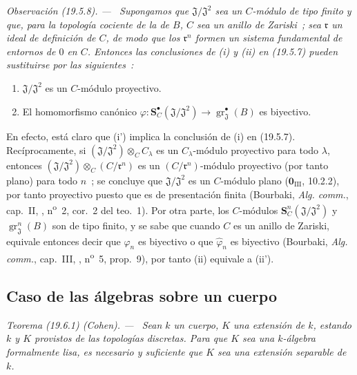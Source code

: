 \documentclass[10pt,oneside]{book}
\makeatletter
\newcommand{\gr}{\operatorname{gr}}
\newcommand{\setmanualcurrentlabel}[1]{\def\@currentlabel{#1}}
\newenvironment{theorem}[1][]{%
  \setmanualcurrentlabel{#1}\par\medskip\noindent\itshape Teorema (#1). ---\ }{\par}
\newenvironment{remark}[1][]{%
  \setmanualcurrentlabel{#1}\par\medskip\noindent\itshape Observación (#1). ---\ }{\par}
\makeatother
\begin{document}
\begin{remark}[19.5.8]
\label{0.19.5.8-es}
Supongamos que $\mathfrak J/\mathfrak J^2$ sea un $C$-módulo \emph{de tipo finito} y
que, para la topología cociente de la de $B$, $C$ sea un \emph{anillo de Zariski}~;
sea $\mathfrak r$ un ideal de definición de $C$, de modo que los
$\mathfrak r^n$ formen un sistema fundamental de entornos de $0$ en $C$.
Entonces las conclusiones de (i) y (ii) en (19.5.7) pueden sustituirse por
las siguientes~:
\begin{enumerate}
  \item[\rm(i')] $\mathfrak J/\mathfrak J^2$ es un $C$-módulo proyectivo.
  \item[\rm(ii')] El homomorfismo canónico
  $\varphi:\mathbf S_C^\bullet(\mathfrak J/\mathfrak J^2)
  \to\gr_{\mathfrak J}^\bullet(B)$ es biyectivo.
\end{enumerate}
En efecto, está claro que (i') implica la conclusión de (i) en (19.5.7).
Recíprocamente, si $(\mathfrak J/\mathfrak J^2)\otimes_C C_\lambda$ es un
$C_\lambda$-módulo proyectivo para todo $\lambda$, entonces
$(\mathfrak J/\mathfrak J^2)\otimes_C(C/\mathfrak r^n)$ es un
$(C/\mathfrak r^n)$-módulo proyectivo (por tanto plano) para todo $n$~; se concluye
que $\mathfrak J/\mathfrak J^2$ es un $C$-módulo plano
($\mathbf 0_{\mathrm{III}}$, 10.2.2), por tanto proyectivo puesto que es de
presentación finita (Bourbaki, \emph{Alg. comm.}, cap.~II, ,
n\textsuperscript{o}~2, cor.~2 del teo.~1). Por otra parte, los $C$-módulos
$\mathbf S_C^n(\mathfrak J/\mathfrak J^2)$ y $\gr_{\mathfrak J}^n(B)$ son
de tipo finito, y se sabe que cuando $C$ es un anillo de Zariski, equivale
entonces decir que $\varphi_n$ es biyectivo o que
$\widehat\varphi_n$ es biyectivo (Bourbaki, \emph{Alg. comm.}, cap.~III,
, n\textsuperscript{o}~5, prop.~9), por tanto (ii) equivale a
(ii').
\end{remark}

\subsection{Caso de las álgebras sobre un cuerpo}
\label{subsection:0.19.6-es}

\begin{theorem}[19.6.1) (Cohen]
\label{0.19.6.1-es}
Sean $k$ un cuerpo, $K$ una extensión de $k$, estando $k$ y $K$
provistos de las topologías discretas. Para que $K$ sea una $k$-álgebra
formalmente lisa, es necesario y suficiente que $K$ sea una extensión separable
de $k$.
\end{theorem}
\end{document}

